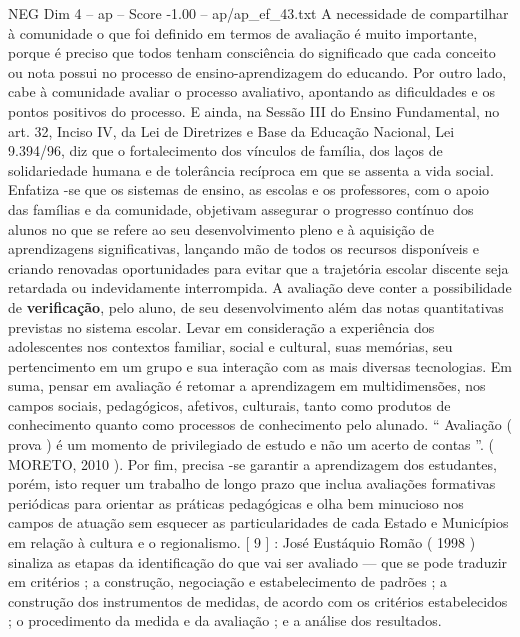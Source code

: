 \begin{textsample}{NEG Dim 4 – ap – Score -1.00 – ap/ap\_ef\_43.txt}
A necessidade de compartilhar à comunidade o que foi definido em termos de avaliação é muito importante, porque é preciso que todos tenham consciência do significado que cada conceito ou nota possui no processo de ensino-aprendizagem do educando.
Por outro lado, cabe à comunidade avaliar o processo avaliativo, apontando as dificuldades e os pontos positivos do processo.
E ainda, na Sessão III do Ensino Fundamental, no art. 32, Inciso IV, da Lei de Diretrizes e Base da Educação Nacional, Lei 9.394/96, diz que o fortalecimento dos vínculos de família, dos laços de solidariedade humana e de tolerância recíproca em que se assenta a vida social.
Enfatiza -se que os sistemas de ensino, as escolas e os professores, com o apoio das famílias e da comunidade, objetivam assegurar o progresso contínuo dos alunos no que se refere ao seu desenvolvimento pleno e à aquisição de aprendizagens significativas, lançando mão de todos os recursos disponíveis e criando renovadas oportunidades para evitar que a trajetória escolar discente seja retardada ou indevidamente interrompida.
A avaliação deve conter a possibilidade de \textbf{verificação}, pelo aluno, de seu desenvolvimento além das notas quantitativas previstas no sistema escolar.
Levar em consideração a experiência dos adolescentes nos contextos familiar, social e cultural, suas memórias, seu pertencimento em um grupo e sua interação com as mais diversas tecnologias.
Em suma, pensar em avaliação é retomar a aprendizagem em multidimensões, nos campos sociais, pedagógicos, afetivos, culturais, tanto como produtos de conhecimento quanto como processos de conhecimento pelo alunado. “ Avaliação ( prova ) é um momento de privilegiado de estudo e não um acerto de contas ”. ( MORETO, 2010 ).
Por fim, precisa -se garantir a aprendizagem dos estudantes, porém, isto requer um trabalho de longo prazo que inclua avaliações formativas periódicas para orientar as práticas pedagógicas e olha bem minucioso nos campos de atuação sem esquecer as particularidades de cada Estado e Municípios em relação à cultura e o regionalismo. [ 9 ] : José Eustáquio Romão ( 1998 ) sinaliza as etapas da identificação do que vai ser avaliado — que se pode traduzir em critérios ; a construção, negociação e estabelecimento de padrões ; a construção dos instrumentos de medidas, de acordo com os critérios estabelecidos ; o procedimento da medida e da avaliação ; e a análise dos resultados.

\end{textsample}
